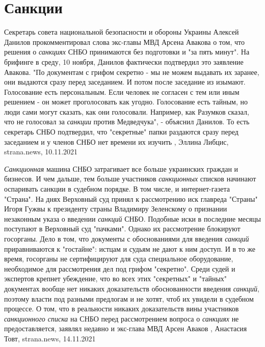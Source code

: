  
 
 
 
 
\chapter{Санкции}

Секретарь совета национальной безопасности и обороны Украины Алексей Данилов
прокомментировал слова экс-главы МВД Арсена Авакова о том, что решения о
\emph{санкциях} СНБО принимаются без подготовки и "за пять минут".  На брифинге в
среду, 10 ноября, Данилов фактически подтвердил это заявление Авакова.  "По
документам с грифом секретно - мы не можем выдавать их заранее, они выдаются
сразу перед заседанием. И потом после заседание из изымают.  Голосование есть
персональным. Если человек не согласен с тем или иным решением - он может
проголосовать как угодно. Голосование есть тайным, но люди сами могут сказать,
как они голосовали. Например, как Разумков сказал, что не голосовал за \emph{санкции}
против Медведчука", - объяснил Данилов.  То есть секретарь СНБО подтвердил, что
"секретные" папки раздаются сразу перед заседанием и у членов СНБО нет времени
их изучить
, 
Эллина Либцис, strana.news, 10.11.2021

\emph{Санкционная} машина СНБО затрагивает все больше украинских граждан и бизнесов. И
чем дальше, тем больше участников \emph{санкционных} списков начинают оспаривать
санкции в судебном порядке. В том числе, и интернет-газета "Страна".  На днях
Верховный суд принял к рассмотрению иск главреда "Страны" Игоря Гужвы к
президенту страны Владимиру Зеленскому о признании незаконным указа о введении
\emph{санкций} СНБО.  Подобные иски в последние месяцы поступают в Верховный суд
"пачками". Однако их рассмотрение блокируют госорганы. Дело в том, что
документы с обоснованиями для введения \emph{санкций} приравниваются к "гостайне":
истцам и судьям не дают к ним доступ. И в то же время, госорганы не
сертифицируют для суда специальное оборудование, необходимое для рассмотрения
дел под грифом "секретно".  Среди судей и экспертов крепнет убеждение, что во
всех этих "секретных" и "тайных" документах вообще нет никаких доказательств
обоснованности введения \emph{санкций}, поэтому власти под разными предлогам и не
хотят, чтоб их увидели в судебном процессе.  О том, что в реальности никаких
доказательств вины участников \emph{санкционного списка} на СНБО перед рассмотрением
вопроса о \emph{санкциях} не предоставляется, заявлял недавно и экс-глава МВД Арсен
Аваков
, 
Анастасия Товт, strana.news, 14.11.2021
